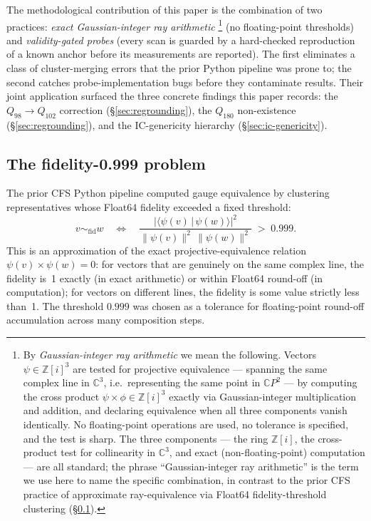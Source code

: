 \documentclass[12pt,a4paper]{article}
\theoremstyle{definition}
\theoremstyle{remark}
\newcommand{\bZ}{\mathbb{Z}}
\newcommand{\bC}{\mathbb{C}}
\begin{document}
The methodological contribution of this paper is the combination of
two practices: \emph{exact Gaussian-integer ray arithmetic}%
\footnote{By \emph{Gaussian-integer ray arithmetic} we mean the
following. Vectors $\psi \in \bZ[i]^3$ are tested for projective
equivalence --- spanning the same complex line in $\bC^3$, i.e.\
representing the same point in $\bC P^2$ --- by computing the cross
product $\psi \times \phi \in \bZ[i]^3$ exactly via Gaussian-integer
multiplication and addition, and declaring equivalence when all three
components vanish identically. No floating-point operations are used,
no tolerance is specified, and the test is sharp. The three
components --- the ring $\bZ[i]$, the cross-product test for
collinearity in $\bC^3$, and exact (non-floating-point) computation
--- are all standard; the phrase ``Gaussian-integer ray arithmetic''
is the term we use here to name the specific combination, in
contrast to the prior CFS practice of approximate ray-equivalence via
Float64 fidelity-threshold clustering (\S\ref{sec:methods-fidelity}).}
(no floating-point thresholds) and \emph{validity-gated probes} (every
scan is guarded by a hard-checked reproduction of a known anchor
before its measurements are reported). The first eliminates a class
of cluster-merging errors that the prior Python pipeline was prone to;
the second catches probe-implementation bugs before they contaminate
results. Their joint application surfaced the three concrete findings
this paper records: the $Q_{98} \to Q_{102}$ correction
(\S\ref{sec:regrounding}), the $Q_{180}$ non-existence
(\S\ref{sec:regrounding}), and the IC-genericity hierarchy
(\S\ref{sec:ic-genericity}).

\subsection{The fidelity-0.999 problem}\label{sec:methods-fidelity}

The prior CFS Python pipeline computed gauge equivalence by clustering
representatives whose Float64 fidelity exceeded a fixed threshold:
\begin{equation}\label{eq:fid}
v \sim_{\text{fid}} w \quad \Longleftrightarrow \quad
\frac{|\langle\psi(v) \,|\, \psi(w)\rangle|^2}
     {\|\psi(v)\|^2 \, \|\psi(w)\|^2} \;>\; 0.999.
\end{equation}
This is an approximation of the exact projective-equivalence relation
$\psi(v) \times \psi(w) = 0$: for vectors that are genuinely on the
same complex line, the fidelity is~1 exactly (in exact arithmetic) or
within Float64 round-off (in computation); for vectors on different
lines, the fidelity is some value strictly less than~1. The threshold
$0.999$ was chosen as a tolerance for floating-point round-off
accumulation across many composition steps.
\end{document}
